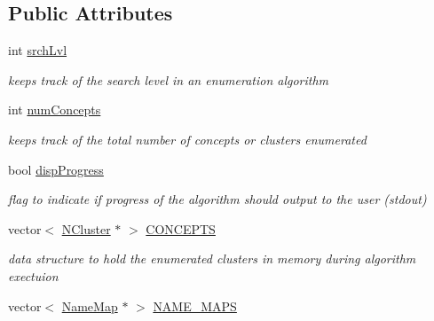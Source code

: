 \subsection*{Public Attributes}
\begin{DoxyCompactItemize}
\item 
\hypertarget{class_lattice_algos_a7061dd2e2590fa24e0dfb16f28509dce}{
int \hyperlink{class_lattice_algos_a7061dd2e2590fa24e0dfb16f28509dce}{srchLvl}}
\label{class_lattice_algos_a7061dd2e2590fa24e0dfb16f28509dce}

\begin{DoxyCompactList}\small\item\em keeps track of the search level in an enumeration algorithm \item\end{DoxyCompactList}\item 
\hypertarget{class_lattice_algos_a8a6e4d766e7f93a288e015e93b3183a0}{
int \hyperlink{class_lattice_algos_a8a6e4d766e7f93a288e015e93b3183a0}{numConcepts}}
\label{class_lattice_algos_a8a6e4d766e7f93a288e015e93b3183a0}

\begin{DoxyCompactList}\small\item\em keeps track of the total number of concepts or clusters enumerated \item\end{DoxyCompactList}\item 
\hypertarget{class_lattice_algos_a7c599d38a3a66b926d7345153ca2e93c}{
bool \hyperlink{class_lattice_algos_a7c599d38a3a66b926d7345153ca2e93c}{dispProgress}}
\label{class_lattice_algos_a7c599d38a3a66b926d7345153ca2e93c}

\begin{DoxyCompactList}\small\item\em flag to indicate if progress of the algorithm should output to the user (stdout) \item\end{DoxyCompactList}\item 
\hypertarget{class_lattice_algos_a006fbb44cdb89ab949bc9f47ed20a6d3}{
vector$<$ \hyperlink{class_n_cluster}{NCluster} $\ast$ $>$ \hyperlink{class_lattice_algos_a006fbb44cdb89ab949bc9f47ed20a6d3}{CONCEPTS}}
\label{class_lattice_algos_a006fbb44cdb89ab949bc9f47ed20a6d3}

\begin{DoxyCompactList}\small\item\em data structure to hold the enumerated clusters in memory during algorithm exectuion \item\end{DoxyCompactList}\item 
\hypertarget{class_lattice_algos_a242b1f9b2ec58cec08c4c5c074c0c1e7}{
vector$<$ \hyperlink{class_name_map}{NameMap} $\ast$ $>$ \hyperlink{class_lattice_algos_a242b1f9b2ec58cec08c4c5c074c0c1e7}{NAME\_\-MAPS}}
\label{class_lattice_algos_a242b1f9b2ec58cec08c4c5c074c0c1e7}


\end{DoxyCompactItemize}
